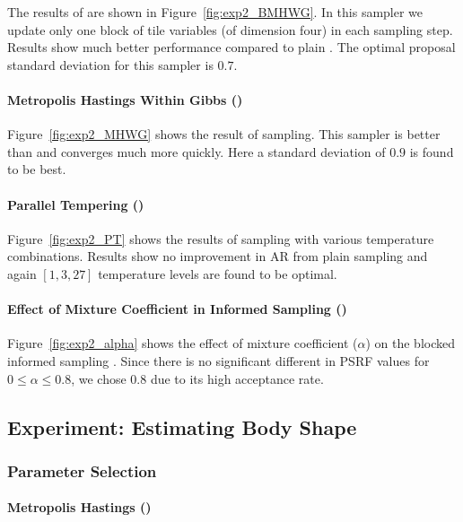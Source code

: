The results of \BMHWG are shown in Figure~\ref{fig:exp2_BMHWG}. In
this sampler we update only one block of tile variables (of dimension
four) in each sampling step. Results show much better performance
compared to plain \MH. The optimal proposal standard deviation for
this sampler is $0.7$.

\paragraph{Metropolis Hastings Within Gibbs (\MHWG)}

Figure~\ref{fig:exp2_MHWG} shows the result of \MHWG sampling. This
sampler is better than \BMHWG and converges much more quickly. Here
a standard deviation of $0.9$ is found to be best.

\paragraph{Parallel Tempering (\PT)}

Figure~\ref{fig:exp2_PT} shows the results of \PT sampling with various
temperature combinations. Results show no improvement in AR from plain
\MH sampling and again $[1,3,27]$ temperature levels are found to be optimal.

\paragraph{Effect of Mixture Coefficient in Informed Sampling (\INFBMHWG)}

Figure~\ref{fig:exp2_alpha} shows the effect of mixture
coefficient ($\alpha$) on the blocked informed sampling
\INFBMHWG. Since there is no significant different in PSRF values for
$0 \le \alpha \le 0.8$, we chose $0.8$ due to its high acceptance
rate.



\subsection{Experiment: Estimating Body Shape}
\label{appendix:chap3:body}

\subsubsection{Parameter Selection}
\paragraph{Metropolis Hastings (\MH)}

